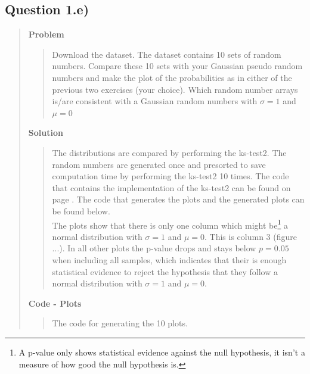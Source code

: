 
\subsection*{\textbf{Question 1.e)}}
\begin{quote}

\textbf{Problem}
\begin{quote}
Download the dataset. The dataset contains 10 sets of random numbers. Compare these 10 sets with your Gaussian pseudo random numbers and make the plot of the probabilities as in either of the previous two exercises (your choice). Which random number arrays is/are consistent with a Gaussian random numbers with $\sigma = 1$ and $\mu = 0$
\end{quote}

\textbf{Solution} 
\begin{quote}
The distributions are compared by performing the ks-test2. The random numbers are generated once and presorted to save computation time by performing the ks-test2 10 times. The code that contains the implementation of the ks-test2 can be found on page \pageref{CODE:Statistics}.  The code that generates the plots and the generated plots can be found below.
\\
The plots show that there is only one column which might be\footnote{A p-value only shows statistical evidence against the null hypothesis, it isn't a measure of how good the null hypothesis is.} a normal distribution with $\sigma = 1$ and $\mu = 0$. This is column 3 (figure ...). In all other plots the p-value drops and stays below $ p = 0.05$ when including all samples, which indicates that their is enough statistical evidence to reject the hypothesis that they follow a normal distribution with $\sigma = 1$ and $\mu = 0$. 

\end{quote}
\newpage

\textbf{Code - Plots}

\begin{quote}
The code for generating the 10 plots. 

\end{quote}
\newpage



\end{quote}
